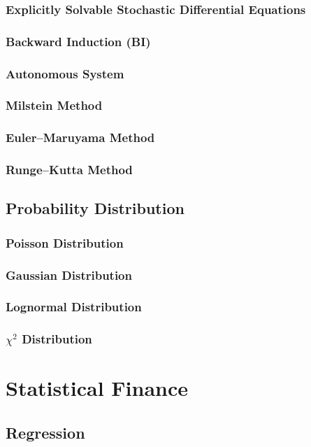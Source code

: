 \subsection{Explicitly Solvable Stochastic Differential Equations}
\subsection{Backward Induction (BI)}
\subsection{Autonomous System}
\subsection{Milstein Method}
\subsection{Euler--Maruyama Method}
\subsection{Runge--Kutta Method}

\section{Probability Distribution}
\subsection{Poisson Distribution}
\subsection{Gaussian Distribution}
\subsection{Lognormal Distribution}
\subsection{$\chi^2$ Distribution}


\chapter{Statistical Finance}
\section{Regression}
